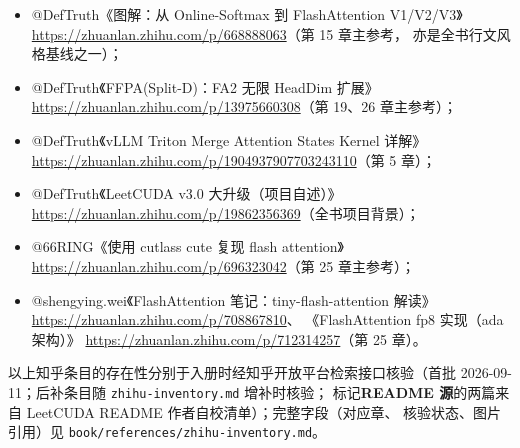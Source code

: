 \begin{itemize}
  \item @DefTruth《图解：从 Online-Softmax 到 FlashAttention V1/V2/V3》
        \url{https://zhuanlan.zhihu.com/p/668888063}（第 15 章主参考，
        亦是全书行文风格基线之一）；
  \item @DefTruth《FFPA(Split-D)：FA2 无限 HeadDim 扩展》
        \url{https://zhuanlan.zhihu.com/p/13975660308}（第 19、26 章主参考）；
  \item @DefTruth《vLLM Triton Merge Attention States Kernel 详解》
        \url{https://zhuanlan.zhihu.com/p/1904937907703243110}（第 5 章）；
  \item @DefTruth《LeetCUDA v3.0 大升级（项目自述）》
        \url{https://zhuanlan.zhihu.com/p/19862356369}（全书项目背景）；
  \item @66RING《使用 cutlass cute 复现 flash attention》
        \url{https://zhuanlan.zhihu.com/p/696323042}（第 25 章主参考）；
  \item @shengying.wei《FlashAttention 笔记：tiny-flash-attention 解读》
        \url{https://zhuanlan.zhihu.com/p/708867810}、
        《FlashAttention fp8 实现（ada 架构）》
        \url{https://zhuanlan.zhihu.com/p/712314257}（第 25 章）。
\end{itemize}

以上知乎条目的存在性分别于入册时经知乎开放平台检索接口核验（首批
2026-09-11；后补条目随 \texttt{zhihu-inventory.md} 增补时核验；
标记\textbf{README 源}的两篇来自 LeetCUDA README 作者自校清单）；完整字段（对应章、
核验状态、图片引用）见 \texttt{book/\allowbreak{}references/\allowbreak{}zhihu-inventory.\allowbreak{}md}。

\emergencystretch=0pt
\fussy
